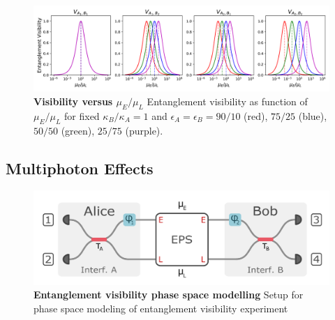 \documentclass[11pt]{caltech_thesis} %
\begin{document}
\hypertarget{fig:ent_fid_single_photon}{%
\begin{figure}
\centering
\includegraphics[width=1\textwidth,height=\textheight]{./chapter_09/figs/ent_fid_single_photon_fixed_kappa.png}
\caption[{Visibility versus \(\mu_E/\mu_L\)}]{\textbf{Visibility versus $\mu_E/\mu_L$} Entanglement visibility as function of $\mu_E/\mu_L$ for fixed $\kappa_B/\kappa_A = 1$ and $\epsilon_A = \epsilon_B = 90/10$ (red), $75/25$ (blue), $50/50$ (green), $25/75$ (purple).}
\label{fig:ent_fid_single_photon}
\end{figure}
}

\hypertarget{multiphoton-effects}{%
\subsection{Multiphoton Effects}\label{multiphoton-effects}}

\hypertarget{fig:model_setup}{%
\begin{figure}
\centering
\includegraphics[width=1\textwidth,height=\textheight]{./chapter_09/figs/model_setup.png}
\caption[{Entanglement visibility phase space modelling}]{\textbf{Entanglement visibility phase space modelling} Setup for phase space modeling of entanglement visibility experiment}
\label{fig:model_setup}
\end{figure}
}
\end{document}

